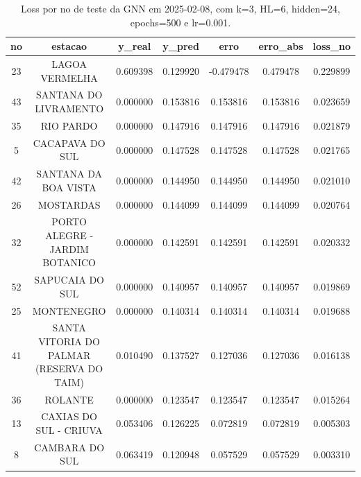 \begin{table}[h]
\centering
\caption{Loss por no de teste da GNN em 2025-02-08, com k=3, HL=6, hidden=24, epochs=500 e lr=0.001.}
\label{tab:gnn_loss_k3_hl6_h24_e500_d20250208}
\begin{tabular}{ccccccc}
\toprule
no & estacao & y\_real & y\_pred & erro & erro\_abs & loss\_no \\
\midrule
23 & LAGOA VERMELHA & 0.609398 & 0.129920 & -0.479478 & 0.479478 & 0.229899 \\
43 & SANTANA DO LIVRAMENTO & 0.000000 & 0.153816 & 0.153816 & 0.153816 & 0.023659 \\
35 & RIO PARDO & 0.000000 & 0.147916 & 0.147916 & 0.147916 & 0.021879 \\
5 & CACAPAVA DO SUL & 0.000000 & 0.147528 & 0.147528 & 0.147528 & 0.021765 \\
42 & SANTANA DA BOA VISTA & 0.000000 & 0.144950 & 0.144950 & 0.144950 & 0.021010 \\
26 & MOSTARDAS & 0.000000 & 0.144099 & 0.144099 & 0.144099 & 0.020764 \\
32 & PORTO ALEGRE - JARDIM BOTANICO & 0.000000 & 0.142591 & 0.142591 & 0.142591 & 0.020332 \\
52 & SAPUCAIA DO SUL & 0.000000 & 0.140957 & 0.140957 & 0.140957 & 0.019869 \\
25 & MONTENEGRO & 0.000000 & 0.140314 & 0.140314 & 0.140314 & 0.019688 \\
41 & SANTA VITORIA DO PALMAR (RESERVA DO TAIM) & 0.010490 & 0.137527 & 0.127036 & 0.127036 & 0.016138 \\
36 & ROLANTE & 0.000000 & 0.123547 & 0.123547 & 0.123547 & 0.015264 \\
13 & CAXIAS DO SUL - CRIUVA & 0.053406 & 0.126225 & 0.072819 & 0.072819 & 0.005303 \\
8 & CAMBARA DO SUL & 0.063419 & 0.120948 & 0.057529 & 0.057529 & 0.003310 \\
\bottomrule
\end{tabular}
\end{table}
